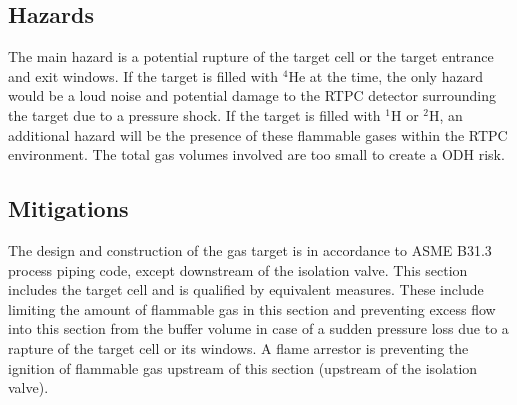 \subsection{Hazards} 

The main hazard is a potential rupture of the target cell or the target entrance and exit windows. 
If the target is filled with $^4$He at the time, the only hazard would be a loud noise and potential damage
to the RTPC detector surrounding the target due to a pressure shock. If the target is filled with
$^1$H or $^2$H, an additional hazard will be the presence of these flammable gases within the RTPC
environment. The total gas volumes involved are too small to create a ODH risk.

%

\subsection{Mitigations}

The design and construction of the gas target is in accordance to ASME B31.3 process piping code,
except downstream of the isolation valve. This section includes the target cell and is qualified by equivalent measures.
These include limiting the amount of flammable gas in this section and preventing excess flow into this 
section from the buffer volume in case of a sudden pressure loss due to a rapture of the target cell or its windows. 
A flame arrestor is preventing the ignition of flammable gas upstream of this section (upstream of the isolation valve).

